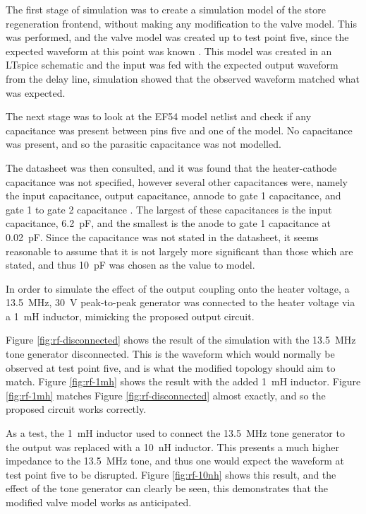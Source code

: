The first stage of simulation was to create a simulation model of the store regeneration frontend, without making any modification to the valve model. This was performed, and the valve model was created up to test point five, since the expected waveform at this point was known \cite[p.3]{linnington2016b}. This model was created in an LTspice schematic and the input was fed with the expected output waveform from the delay line, simulation showed that the observed waveform matched what was expected.

The next stage was to look at the EF54 model netlist and check if any capacitance was present between pins five and one of the model. No capacitance was present, and so the parasitic capacitance was not modelled.

The datasheet was then consulted, and it was found that the heater-cathode capacitance was not specified, however several other capacitances were, namely the input capacitance, output capacitance, annode to gate 1 capacitance, and gate 1 to gate 2 capacitance \cite{mullardb}. The largest of these capacitances is the input capacitance, \SI{6.2}{\pico\farad}, and the smallest is the anode to gate 1 capacitance at \SI{0.02}{\pico\farad}. Since the capacitance was not stated in the datasheet, it seems reasonable to assume that it is not largely more significant than those which are stated, and thus \SI{10}{\pico\farad} was chosen as the value to model.

In order to simulate the effect of the output coupling onto the heater voltage, a \SI{13.5}{\mega\hertz}, \SI{30}{\volt} peak-to-peak generator was connected to the heater voltage via a \SI{1}{\milli\henry} inductor, mimicking the proposed output circuit.


Figure \ref{fig:rf-disconnected} shows the result of the simulation with the \SI{13.5}{\mega\hertz} tone generator disconnected. This is the waveform which would normally be observed at test point five, and is what the modified topology should aim to match. Figure \ref{fig:rf-1mh} shows the result with the added \SI{1}{\milli\henry} inductor. Figure \ref{fig:rf-1mh} matches Figure \ref{fig:rf-disconnected} almost exactly, and so the proposed circuit works correctly.

As a test, the \SI{1}{\milli\henry} inductor used to connect the \SI{13.5}{\mega\hertz} tone generator to the output was replaced with a \SI{10}{\nano\henry} inductor. This presents a much higher impedance to the \SI{13.5}{\mega\hertz} tone, and thus one would expect the waveform at test point five to be disrupted. Figure \ref{fig:rf-10nh} shows this result, and the effect of the tone generator can clearly be seen, this demonstrates that the modified valve model works as anticipated.


